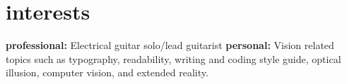 \documentclass[]{cv-style}          %
\begin{document}







\section{interests}
  \vspace{-0.2cm}

\textbf{professional:} Electrical guitar solo/lead guitarist \textbf{ personal:} Vision related topics such as typography, readability, writing and coding style guide, optical illusion, computer vision, and extended reality.
\end{document}
